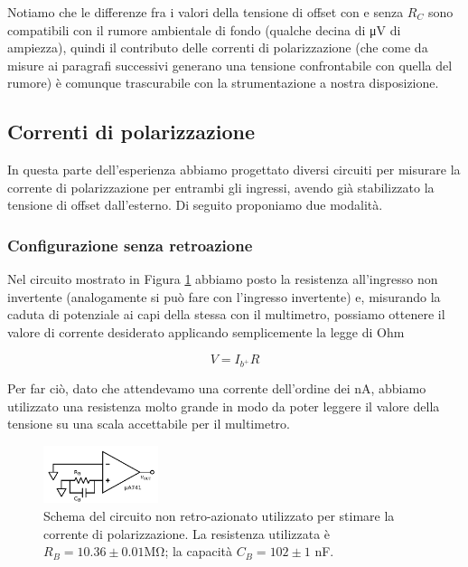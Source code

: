 Notiamo che le differenze fra i valori della tensione di offset con e senza $R_C$ sono compatibili con il rumore ambientale di fondo (qualche decina di \si{\micro\volt} di ampiezza), quindi il contributo delle correnti di polarizzazione (che come da misure ai paragrafi successivi generano una tensione confrontabile con quella del rumore) è comunque trascurabile con la strumentazione a nostra disposizione.

\subsection{Correnti di polarizzazione}

In questa parte dell'esperienza abbiamo progettato diversi circuiti per misurare la corrente di polarizzazione per entrambi gli ingressi, avendo già stabilizzato la tensione di offset dall'esterno. Di seguito proponiamo due modalità.

\subsubsection{Configurazione senza retroazione}

Nel circuito mostrato in Figura \ref{circuito:rel2_correnti_senzaretroazione} abbiamo posto la resistenza all'ingresso non invertente (analogamente si può fare con l'ingresso invertente) e, misurando la caduta di potenziale ai capi della stessa con il multimetro, possiamo ottenere il valore di corrente desiderato applicando semplicemente la legge di Ohm

$$V=I_{b^+} R$$

Per far ciò, dato che attendevamo una corrente dell'ordine dei \si{\nano\ampere}, abbiamo utilizzato una resistenza molto grande in modo da poter leggere il valore della tensione su una scala accettabile per il multimetro.

\begin{figure}
  \begin{center}
    \includegraphics[width=0.30\textwidth]{../E02/latex/direct_measure.pdf}
  \end{center}
  \caption{Schema del circuito non retro-azionato utilizzato per stimare la corrente di polarizzazione. La resistenza utilizzata è $R_B=10.36\pm0.01$\si{\mega\ohm}; la capacità $C_B=102 \pm 1$ \si{\nano\farad}.}
  \label{circuito:rel2_correnti_senzaretroazione}
\end{figure}

